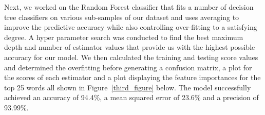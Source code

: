 \documentclass[10pt,twocolumn,letterpaper]{article}
\begin{document}
Next, we worked on the Random Forest classifier that fits a number of decision tree classifiers on various sub-samples of our dataset and uses averaging to improve the predictive accuracy while also controlling over-fitting to a satisfying degree. A hyper parameter search was conducted to find the best maximum depth and number of estimator values that provide us with the highest possible accuracy for our model. We then calculated the training and testing score values and determined the overfitting before generating a confusion matrix, a plot for the scores of each estimator and a plot displaying the feature importances for the top 25 words all shown in Figure~\ref{third_figure} below. The model successfully achieved an accuracy of 94.4\%, a mean squared error of 23.6\% and a precision of 93.99\%.\\ 
\end{document}
